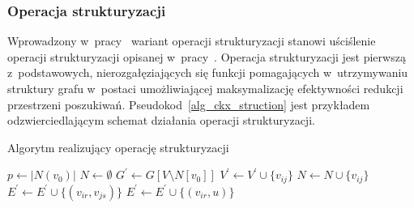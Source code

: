 \subsubsection{\textbf{Operacja strukturyzacji}}\label{sss_ckx_struction}
\par{
  Wprowadzony w~pracy~\cite{ImprovedBounds10} wariant operacji strukturyzacji stanowi uściślenie operacji strukturyzacji opisanej w~pracy~\cite{Ebengger:1984}.
  Operacja strukturyzacji jest pierwszą z~podstawowych, nierozgałęziających się funkcji pomagających w~utrzymywaniu struktury grafu w~postaci umożliwiającej maksymalizację efektywności redukcji przestrzeni poszukiwań.
  Pseudokod~\ref{alg_ckx_struction} jest przykładem odzwierciedlającym schemat działania operacji strukturyzacji.
  \begin{algorithm}
    \caption{Algorytm realizujący operację strukturyzacji}\label{alg_ckx_struction}
    \begin{algorithmic}[1]



        \State $p \gets |N(v_0)|$
        \State $N \gets \emptyset$
        \State $G^\prime \gets G[V \setminus N[v_0]]$
              \State $V^\prime \gets V^\prime \cup \{v_{ij}\}$
              \State $N \gets N \cup \{v_{ij}\}$
            \EndIf
          \EndFor
        \EndFor
              \State $E^\prime \gets E^\prime \cup \{(v_{ir}, v_{js})\}$
            \EndIf
          \EndFor
              \State$E^\prime \gets E^\prime \cup \{(v_{ir}, u)\}$
            \EndIf
          \EndFor
        \EndFor
      \EndFunction
    \end{algorithmic}
  \end{algorithm}
}
